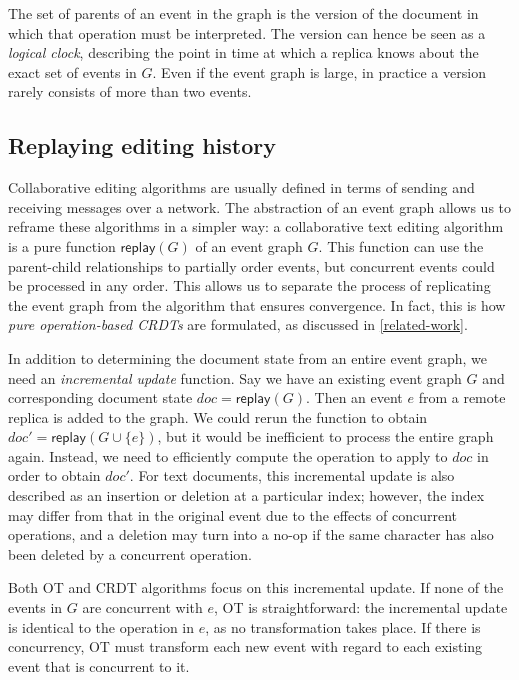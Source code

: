\documentclass[sigplan,10pt]{acmart}
\begin{document}
The set of parents of an event in the graph is the version of the document in which that operation must be interpreted.
The version can hence be seen as a \emph{logical clock}, describing the point in time at which a replica knows about the exact set of events in $G$.
Even if the event graph is large, in practice a version rarely consists of more than two events.

\subsection{Replaying editing history}\label{replay}

Collaborative editing algorithms are usually defined in terms of sending and receiving messages over a network.
The abstraction of an event graph allows us to reframe these algorithms in a simpler way: a collaborative text editing algorithm is a pure function $\mathsf{replay}(G)$ of an event graph $G$.
This function can use the parent-child relationships to partially order events, but concurrent events could be processed in any order.
This allows us to separate the process of replicating the event graph from the algorithm that ensures convergence.
In fact, this is how \emph{pure operation-based CRDTs} \cite{polog} are formulated, as discussed in \autoref{related-work}.

In addition to determining the document state from an entire event graph, we need an \emph{incremental update} function.
Say we have an existing event graph $G$ and corresponding document state $\mathit{doc} = \mathsf{replay}(G)$. Then an event $e$ from a remote replica is added to the graph.
We could rerun the function to obtain $\mathit{doc}' = \mathsf{replay}(G \cup \{e\})$, but it would be inefficient to process the entire graph again.
Instead, we need to efficiently compute the operation to apply to $\mathit{doc}$ in order to obtain $\mathit{doc}'$.
For text documents, this incremental update is also described as an insertion or deletion at a particular index; however, the index may differ from that in the original event due to the effects of concurrent operations, and a deletion may turn into a no-op if the same character has also been deleted by a concurrent operation.

Both OT and CRDT algorithms focus on this incremental update.
If none of the events in $G$ are concurrent with $e$, OT is straightforward: the incremental update is identical to the operation in $e$, as no transformation takes place.
If there is concurrency, OT must transform each new event with regard to each existing event that is concurrent to it.
\end{document}
